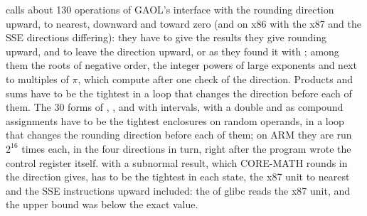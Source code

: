  calls about 130 operations of GAOL's interface
with the rounding direction upward, to nearest, downward and toward zero
(and on x86 with the x87 and the SSE directions differing): they have to
give the results they give rounding upward, and to leave the direction
upward, or as they found it with ; among
them the roots of negative order, the integer powers of large exponents and
 next to multiples of $\pi$, which compute after one
check of the direction.\newinvfive{} Products and sums have to be the
tightest in a loop that changes the direction before each of them. The 30
forms of \code{+ - * / \%}, ,  and 
with intervals, with a double and as compound assignments have to be the tightest enclosures on random operands, in a loop that changes the rounding direction before each of them; on ARM they are run $2^{16}$ times each, in the four directions in turn, right after the program wrote the control register itself.
 with a subnormal
result, which CORE-MATH rounds in the direction  gives,
has to be the tightest in each state, the x87 unit to nearest and the SSE
instructions upward included: the  of glibc reads the x87
unit, and the upper bound was below the exact value.\newinvfive

